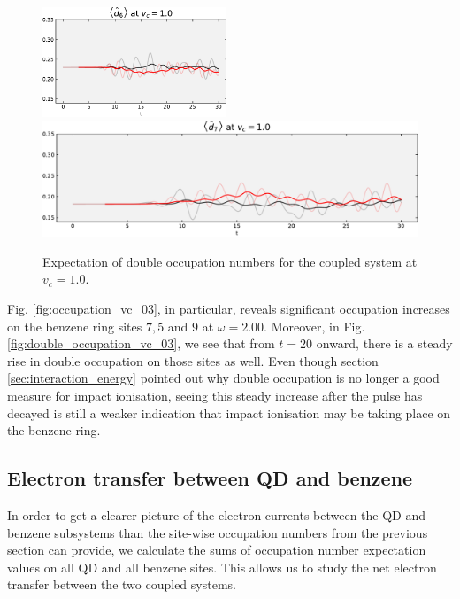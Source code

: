 \begin{figure}[!hbt]
{{\begin{minipage}[b]{.59\textwidth}
                \includegraphics[width=0.49\textwidth]{graph/double_occupation/double_occupation_vc_10_site_6.pdf}
                \includegraphics[width=1.00\textwidth]{graph/double_occupation/double_occupation_vc_10_site_7.pdf}
       \caption{Expectation of double occupation numbers for the coupled system at $v_c = 1.0$.\newline}
        \label{fig:double_occupatino_vc_10}
    \end{minipage}}}
\end{figure}
\newpage

Fig. \ref{fig:occupation_vc_03}, in particular, reveals significant occupation increases on the benzene ring sites $7, 5$ and $9$ at $\omega=2.00$.  Moreover, in Fig. \ref{fig:double_occupation_vc_03}, we see that from $t=20$ onward, there is a steady rise in double occupation on those sites as well. Even though section \ref{sec:interaction_energy} pointed out why double occupation is no longer a good measure for impact ionisation, seeing this steady increase after the pulse has decayed is still a weaker indication that impact ionisation may be taking place on the benzene ring.

\subsection{Electron transfer between QD and benzene} \label{subsec:electron_transfer_QD_benzene}
In order to get a clearer picture of the electron currents between the QD and benzene subsystems than the site-wise occupation numbers from the previous section can provide, we calculate the sums of occupation number expectation values on all QD and all benzene sites. This allows us to study the net electron transfer between the two coupled systems.
\medskip

